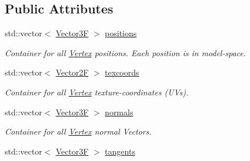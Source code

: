 \subsection*{Public Attributes}
\begin{DoxyCompactItemize}
\item 
\mbox{\label{classtz_1_1graphics_1_1model_1_1_indexed_model_ae94e4a6c4f1dc9bac6c003eda93d849f}} 
std\+::vector$<$ \mbox{\hyperlink{class_vector3}{Vector3F}} $>$ \mbox{\hyperlink{classtz_1_1graphics_1_1model_1_1_indexed_model_ae94e4a6c4f1dc9bac6c003eda93d849f}{positions}}
\begin{DoxyCompactList}\small\item\em Container for all \mbox{\hyperlink{class_vertex}{Vertex}} positions. Each position is in model-\/space. \end{DoxyCompactList}\item 
\mbox{\label{classtz_1_1graphics_1_1model_1_1_indexed_model_a51345de6dc0c2773d503a367a07c9456}} 
std\+::vector$<$ \mbox{\hyperlink{class_vector2}{Vector2F}} $>$ \mbox{\hyperlink{classtz_1_1graphics_1_1model_1_1_indexed_model_a51345de6dc0c2773d503a367a07c9456}{texcoords}}
\begin{DoxyCompactList}\small\item\em Container for all \mbox{\hyperlink{class_vertex}{Vertex}} texture-\/coordinates (U\+Vs). \end{DoxyCompactList}\item 
\mbox{\label{classtz_1_1graphics_1_1model_1_1_indexed_model_a4a9e2cc61d38cb598ae00acb771bd58e}} 
std\+::vector$<$ \mbox{\hyperlink{class_vector3}{Vector3F}} $>$ \mbox{\hyperlink{classtz_1_1graphics_1_1model_1_1_indexed_model_a4a9e2cc61d38cb598ae00acb771bd58e}{normals}}
\begin{DoxyCompactList}\small\item\em Container for all \mbox{\hyperlink{class_vertex}{Vertex}} normal Vectors. \end{DoxyCompactList}\item 
\mbox{\label{classtz_1_1graphics_1_1model_1_1_indexed_model_affe23c0f119019eed8e95f09c4404131}} 
std\+::vector$<$ \mbox{\hyperlink{class_vector3}{Vector3F}} $>$ \mbox{\hyperlink{classtz_1_1graphics_1_1model_1_1_indexed_model_affe23c0f119019eed8e95f09c4404131}{tangents}}

\end{DoxyCompactItemize}
